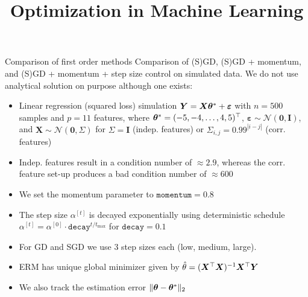 \documentclass[11pt,compress,t,notes=noshow, xcolor=table]{beamer}
\title{Optimization in Machine Learning}
\begin{document}


\begin{vbframe}{Comparison of first order methods}
Comparison of (S)GD, (S)GD + momentum, and (S)GD + momentum + step size control on simulated data. We do not use analytical solution on purpose although one exists:

\begin{itemize}
    \item Linear regression (squared loss) simulation $\bm{Y} = \bm{X}\bm{\theta}^{\ast} + \bm{\varepsilon}$ with $n=500$ samples and $p=11$ features, where $\bm{\theta}^{\ast}=(-5,-4,\ldots,4,5)^{\top}$, $\bm{\varepsilon} \sim \mathcal{N}(\bm{0}, \bm{I})$, and $\bm{X} \sim \mathcal{N}(\bm{0}, \Sigma)$ for $\Sigma=\bm{I}$ (indep. features) or $\Sigma_{i,j}=0.99^{|i-j|}$ (corr. features)
    \item Indep. features result in a condition number of $\approx 2.9$, whereas the corr. feature set-up produces a bad condition number of $\approx 600$
    \item We set the momentum parameter to $\texttt{momentum}=0.8$
    \item The step size $\alpha^{[t]}$ is decayed exponentially using deterministic schedule $\alpha^{[t]}=\alpha^{[0]} \cdot \texttt{decay}^{t/t_{\text{max}}}$ for $\texttt{decay}=0.1$
    \item For GD and SGD we use 3 step sizes each (low, medium, large). %
    \item ERM has unique global minimizer given by $\hat{\theta} = (\bm{X}^{\top}\bm{X})^{-1}\bm{X}^{\top} \bm{Y}$
    \item We also track the estimation error $\Vert \bm{\theta} - \bm{\theta}^{\ast} \Vert_2$
\end{itemize}

\end{vbframe}

\end{document}
